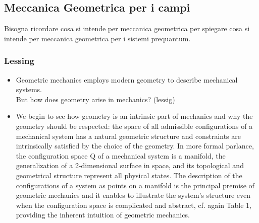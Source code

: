 \documentclass[Main]{subfiles}
\begin{document}
	\subsection{Meccanica Geometrica per i campi}
		Bisogna ricordare cosa si intende per meccanica geometrica per spiegare cosa si intende per meccanica geometrica per i sistemi prequantum.
	
	 	\subsubsection{Lessing}
			\begin{itemize}
				\item Geometric mechanics employs modern geometry to describe mechanical systems.\\
					But how does geometry arise in mechanics?  (lessig)
				\item We begin to see how geometry is an intrinsic part of mechanics and why the geometry should be respected: the space of all admissible configurations of a mechanical system has a natural geometric structure and constraints are intrinsically satisfied by the choice of the geometry. 
				In more formal parlance, the configuration space Q of a mechanical system is a manifold, the generalization of a 2-dimensional surface in space, and its topological and geometrical structure represent all physical states.
				The description of the configurations of a system as points on a manifold is the principal premise of geometric mechanics and it enables to illustrate the system’s structure even when the configuration space is complicated and abstract, cf. again Table 1, providing the inherent intuition of geometric mechanics.
			\end{itemize}
			
\end{document}
